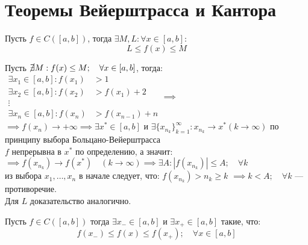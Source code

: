 \section{Теоремы Вейерштрасса и Кантора}
\begin{theorem}
	\label{theorem:weierstrass1}
	Пусть $f \in C([a,b])$, тогда $\exists M,L: \forall x \in [a,b]:$ 
	\[L \le f(x) \le M\] 
\end{theorem}
\begin{replacementproof}
	Пусть $\cancel{\exists} M: f(x)\le M; \quad \forall x \in [a,b]$, тогда:\\
	$\begin{aligned}
		\exists x_1 \in [a,b]: f(x_1) & >1 \\ 
        \exists x_2 \in [a,b]: f(x_2) &>f(x_1)+2 \\ 
        \vdots\\ 
        \exists x_n \in [a,b]: f(x_n) &>f(x_{n-1})+n 
	\end{aligned}\implies $\\
	$\implies f(x_n) \to +\infty \implies \exists x^* \in [a,b]$ и $\exists \{x_{n_k}\}^{\infty}_{k=1}: x_{n_k}\to x^* (k\to \infty)$ по принципу выбора Больцано-Вейерштрасса\\
	$f$ непрерывна в $x^*$ по определению, а значит:\\
	$\implies f(x_{n_k}) \to f(x^*) \quad (k\to \infty) \implies \exists A: |f(x_{n_k})|\le A; \quad \forall k$\\
	из выбора $x_1, \ldots, x_n$ в начале следует, что: $f(x_{n_k})>n_k\ge k $
	$\implies k < A; \quad  \forall k$ --- противоречие.\\

	Для $L$ доказательство аналогично.
\end{replacementproof}


\begin{theorem}
	Пусть $f \in C([a,b])$ тогда $\exists x_- \in [a,b]$ и $\exists x_{+} \in [a,b]$ такие, что:\\
	$$f(x_{-})\le f(x) \le f(x_{+}); \quad \forall x \in [a,b]$$\\
\end{theorem}

